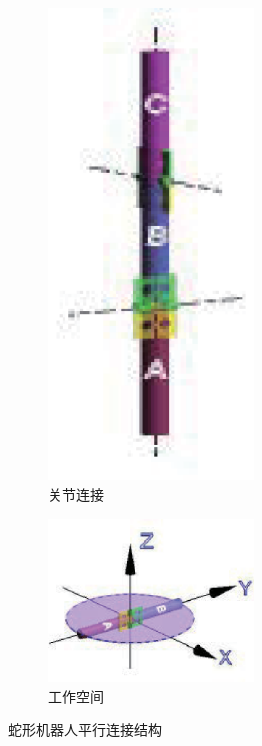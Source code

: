 \begin{figure}[h!] %
	\begin{subfigure}{0.5\textwidth}
		\centering
		\includegraphics[width=0.6\textwidth,height=0.15\textheight]{figure/chap03/parellelmod.eps}
		\caption{关节连接}
		\label{fig:parconnect}
	\end{subfigure}
	\begin{subfigure}{0.5\textwidth}
		\centering
		\includegraphics[width=0.6\textwidth,height=0.15\textheight]{figure/chap03/parallelspace.eps}
		\caption{工作空间}
		\label{fig:parspace}
	\end{subfigure}
	\caption{蛇形机器人平行连接结构}
	\label{fig:parallel}
\end{figure}

